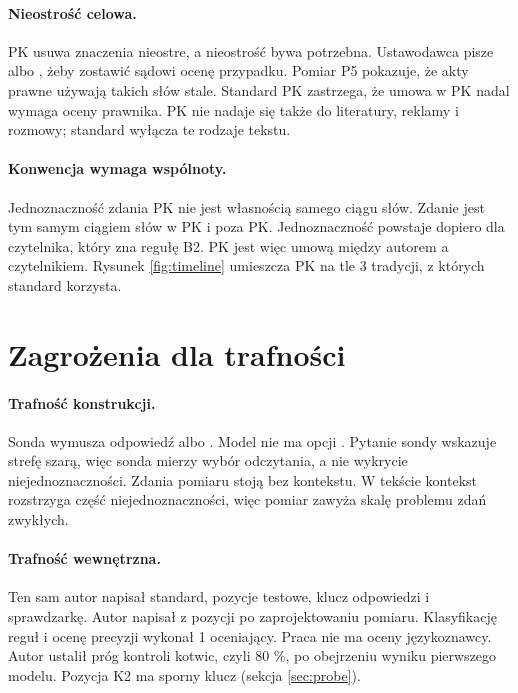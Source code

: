 \paragraph{Nieostrość celowa.}
PK usuwa znaczenia nieostre, a nieostrość bywa potrzebna. Ustawodawca pisze
 albo , żeby zostawić sądowi ocenę przypadku.
Pomiar P5 pokazuje, że akty prawne używają takich słów stale. Standard PK zastrzega, że
umowa w PK nadal wymaga oceny prawnika. PK nie nadaje się także do literatury, reklamy
i rozmowy; standard wyłącza te rodzaje tekstu.

\paragraph{Konwencja wymaga wspólnoty.}
Jednoznaczność zdania PK nie jest własnością samego ciągu słów. Zdanie  jest tym samym ciągiem słów w PK i poza PK. Jednoznaczność powstaje
dopiero dla czytelnika, który zna regułę B2. PK jest więc umową między autorem
a czytelnikiem. Rysunek \ref{fig:timeline} umieszcza PK na tle 3 tradycji, z których
standard korzysta.


\section{Zagrożenia dla trafności}
\label{sec:threats}

\paragraph{Trafność konstrukcji.}
Sonda wymusza odpowiedź  albo . Model nie ma opcji . Pytanie sondy wskazuje strefę szarą, więc sonda mierzy wybór odczytania,
a nie wykrycie niejednoznaczności. Zdania pomiaru stoją bez kontekstu. W tekście kontekst
rozstrzyga część niejednoznaczności, więc pomiar zawyża skalę problemu zdań zwykłych.

\paragraph{Trafność wewnętrzna.}
Ten sam autor napisał standard, pozycje testowe, klucz odpowiedzi i sprawdzarkę.
Autor napisał \pkItemsAuthor{} z \pkItems{} pozycji po zaprojektowaniu pomiaru.
Klasyfikację reguł i ocenę precyzji wykonał 1 oceniający. Praca nie ma oceny językoznawcy.
Autor ustalił próg kontroli kotwic, czyli 80 \%, po obejrzeniu wyniku pierwszego modelu.
Pozycja K2 ma sporny klucz (sekcja \ref{sec:probe}).

